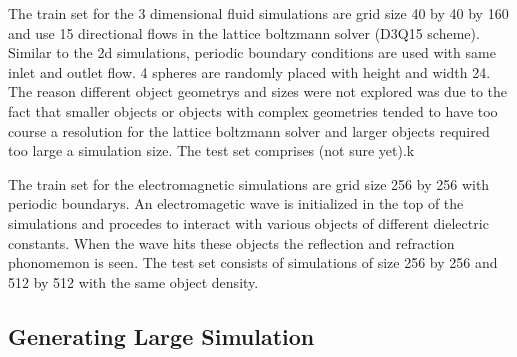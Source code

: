 \documentclass{article}
\begin{document}
The train set for the 3 dimensional fluid simulations are grid size 40 by 40 by 160 and use 15 directional flows in the lattice boltzmann solver (D3Q15 scheme)\cite{guo2013lattice}. Similar to the 2d simulations, periodic boundary conditions are used with same inlet and outlet flow. 4 spheres are randomly placed with height and width 24. The reason different object geometrys and sizes were not explored was due to the fact that smaller objects or objects with complex geometries tended to have too course a resolution for the lattice boltzmann solver and larger objects required too large a simulation size. The test set comprises (not sure yet).k

The train set for the electromagnetic simulations are grid size 256 by 256 with periodic boundarys. An electromagetic wave is initialized in the top of the simulations and procedes to interact with various objects of different dielectric constants. When the wave hits these objects the reflection and refraction phonomemon is seen. The test set consists of simulations of size 256 by 256 and 512 by 512 with the same object density.

\subsection{Generating Large Simulation}
\end{document}
